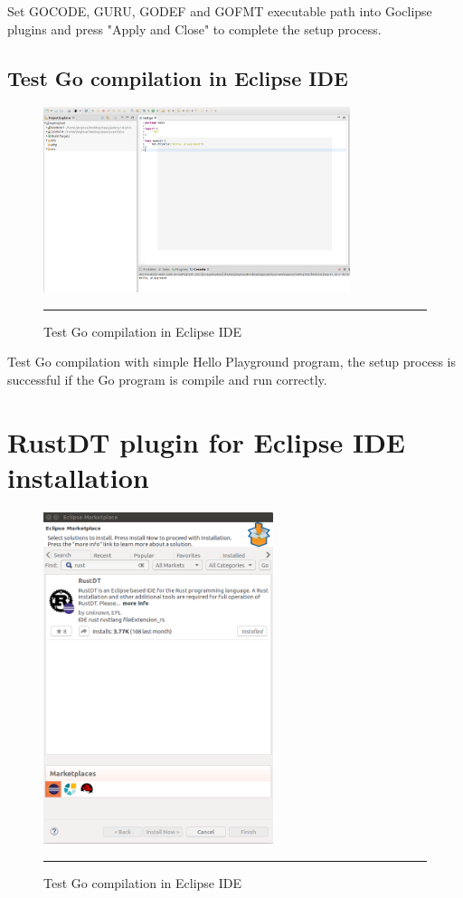 Set GOCODE, GURU, GODEF and GOFMT executable path into Goclipse plugins and press "Apply and Close" to complete the setup process. 

\subsection{Test Go compilation in Eclipse IDE}

\begin{figure}[H]
	\centering
	\includegraphics[width=0.8\textwidth]{Figure/AppendixA/goclipse-installation/7-goclipse-success.png}
	\rule{35em}{0.5pt}
	\caption[Test Go compilation in Eclipse IDE]{Test Go compilation in Eclipse IDE}
\end{figure}

Test Go compilation with simple Hello Playground program, the setup process is successful if the Go program is compile and run correctly. 

\section{RustDT plugin for Eclipse IDE installation}

\begin{figure}[H]
	\centering
	\includegraphics[width=0.6\textwidth]{Figure/AppendixA/rustdt-installation/1-rust-perspective.png}
	\rule{35em}{0.5pt}
	\caption[Test Go compilation in Eclipse IDE]{Test Go compilation in Eclipse IDE}
\end{figure}

